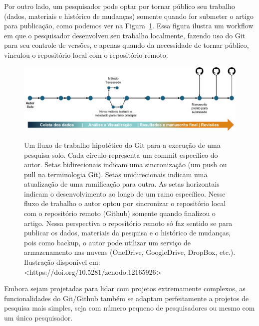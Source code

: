 \documentclass[
  a4paper,
]{book}
\begin{document}
Por outro lado, um pesquisador pode optar por tornar público seu
trabalho (dados, materiais e histórico de mudanças) somente quando for
submeter o artigo para publicação, como podemos ver na
Figura~\ref{fig-gitautorend}. Essa figura ilustra um workflow em que o
pesquisador desenvolveu seu trabalho localmente, fazendo uso do Git para
seu controle de versões, e apenas quando da necessidade de tornar
público, vinculou o repositório local com o repositório remoto.

\begin{figure}

\href{https://doi.org/10.5281/zenodo.12165926}{\includegraphics{img/gitautorend.jpg}}

\caption{\label{fig-gitautorend}Um fluxo de trabalho hipotético do Git
para a execução de uma pesquisa solo. Cada círculo representa um commit
específico do autor. Setas bidirecionais indicam uma sincronização (um
push ou pull na terminologia Git). Setas unidirecionais indicam uma
atualização de uma ramificação para outra. As setas horizontais indicam
o desenvolvimento ao longo de um ramo específico. Nesse fluxo de
trabalho o autor optou por sincronizar o repositório local com o
repositório remoto (Github) somente quando finalizou o artigo. Nessa
perspectiva o repositório remoto só faz sentido se para publicar os
dados, materiais da pesquisa e o histórico de mudanças, pois como
backup, o autor pode utilizar um serviço de armazenamento nas nuvens
(OneDrive, GoogleDrive, DropBox, etc.). Ilustração disponível em:
\textless https://doi.org/10.5281/zenodo.12165926\textgreater{}}

\end{figure}%

Embora sejam projetadas para lidar com projetos extremamente complexos,
as funcionalidades do Git/Github também se adaptam perfeitamente a
projetos de pesquisa mais simples, seja com número pequeno de
pesquisadores ou mesmo com um único pesquisador.
\end{document}
